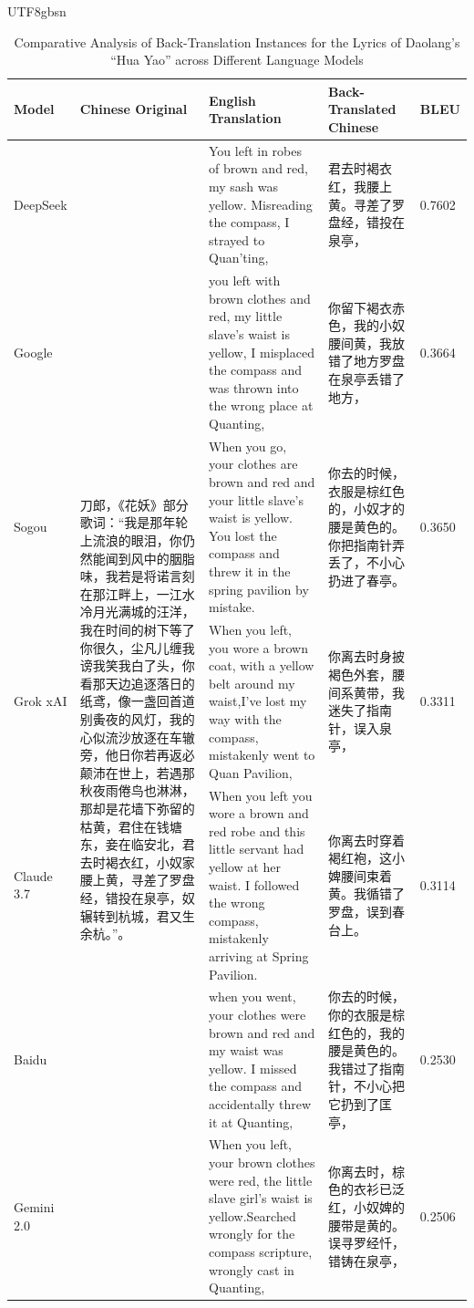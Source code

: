 \documentclass[conference]{IEEEtran}
\begin{document}
\begin{CJK}{UTF8}{gbsn}
\begin{table}[h]
\centering
\caption{Comparative Analysis of Back-Translation Instances for the Lyrics of Daolang’s ``Hua Yao'' across Different Language Models}
\begin{tabular}{lp{4cm}p{4cm}p{4cm}l}
\toprule
Model & Chinese Original & English Translation & Back-Translated Chinese & BLEU \\
\midrule
DeepSeek & \multirow{8}{}{\parbox{3.6cm}{刀郎，《花妖》部分歌词：``我是那年轮上流浪的眼泪，你仍然能闻到风中的胭脂味，我若是将诺言刻在那江畔上，一江水冷月光满城的汪洋，我在时间的树下等了你很久，尘凡儿缠我谤我笑我白了头，你看那天边追逐落日的纸鸢，像一盏回首道别夤夜的风灯，我的心似流沙放逐在车辙旁，他日你若再返必颠沛在世上，若遇那秋夜雨倦鸟也淋淋，那却是花墙下弥留的枯黄，君住在钱塘东，妾在临安北，君去时褐衣红，小奴家腰上黄，寻差了罗盘经，错投在泉亭，奴辗转到杭城，君又生余杭。''。}} 
& You left in robes of brown and red, my sash was yellow. Misreading the compass, I strayed to Quan’ting, & 君去时褐衣红，我腰上黄。寻差了罗盘经，错投在泉亭， & 0.7602 \\
Google & & you left with brown clothes and red, my little slave's waist is yellow, I misplaced the compass and was thrown into the wrong place at Quanting, & 你留下褐衣赤色，我的小奴腰间黄，我放错了地方罗盘在泉亭丢错了地方， & 0.3664 \\
Sogou & & When you go, your clothes are brown and red and your little slave's waist is yellow. You lost the compass and threw it in the spring pavilion by mistake. & 你去的时候，衣服是棕红色的，小奴才的腰是黄色的。你把指南针弄丢了，不小心扔进了春亭。 & 0.3650 \\
Grok xAI & & When you left, you wore a brown coat, with a yellow belt around my waist,I've lost my way with the compass, mistakenly went to Quan Pavilion, & 你离去时身披褐色外套，腰间系黄带，我迷失了指南针，误入泉亭， & 0.3311 \\
Claude 3.7 & & When you left you wore a brown and red robe and this little servant had yellow at her waist. I followed the wrong compass, mistakenly arriving at Spring Pavilion. & 你离去时穿着褐红袍，这小婢腰间束着黄。我循错了罗盘，误到春台上。 & 0.3114 \\
Baidu & & when you went, your clothes were brown and red and my waist was yellow. I missed the compass and accidentally threw it at Quanting, & 你去的时候，你的衣服是棕红色的，我的腰是黄色的。我错过了指南针，不小心把它扔到了匡亭， & 0.2530 \\
Gemini 2.0 & & When you left, your brown clothes were red, the little slave girl's waist is yellow.Searched wrongly for the compass scripture, wrongly cast in Quanting, & 你离去时，棕色的衣衫已泛红，小奴婢的腰带是黄的。误寻罗经忏，错铸在泉亭， & 0.2506 \\

\end{tabular}
\end{table}
\end{CJK}
\end{document}

